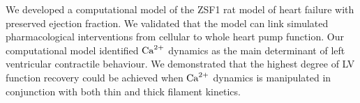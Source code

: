 \vspace{0.2cm}
We developed a computational model of the ZSF1 rat model of heart failure with preserved ejection fraction. We validated that the model can link simulated pharmacological interventions from cellular to whole heart pump function. Our computational model identified $\textrm{Ca}^{2+}$ dynamics as the main determinant of left ventricular contractile behaviour. We demonstrated that the highest degree of LV function recovery could be achieved when $\textrm{Ca}^{2+}$ dynamics is manipulated in conjunction with both thin and thick filament kinetics.